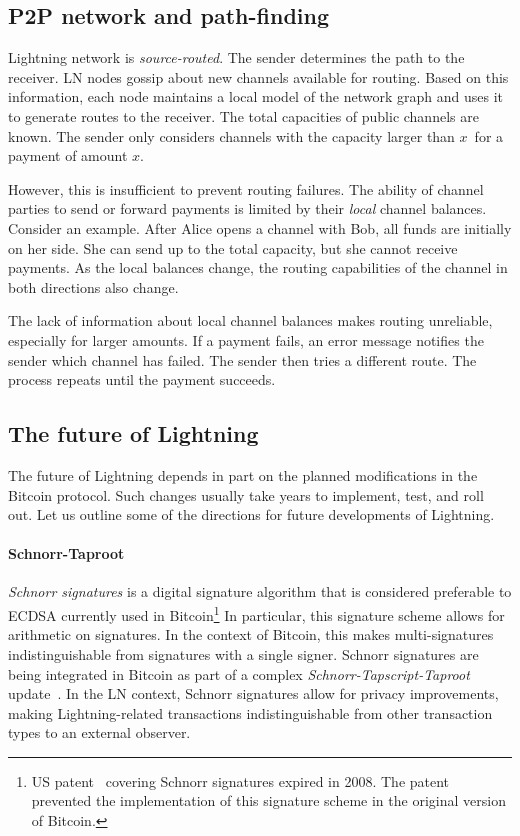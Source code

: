 \subsection{P2P network and path-finding}

Lightning network is \textit{source-routed}.
The sender determines the path to the receiver.
LN nodes gossip about new channels available for routing.
Based on this information, each node maintains a local model of the network graph and uses it to generate routes to the receiver.
The total capacities of public channels are known.
The sender only considers channels with the capacity larger than $x$~for a payment of amount $x$.

However, this is insufficient to prevent routing failures.
The ability of channel parties to send or forward payments is limited by their \textit{local} channel balances.
Consider an example.
After Alice opens a channel with Bob, all funds are initially on her side.
She can send up to the total capacity, but she cannot receive payments.
As the local balances change, the routing capabilities of the channel in both directions also change.

The lack of information about local channel balances makes routing unreliable, especially for larger amounts.
If a payment fails, an error message notifies the sender which channel has failed.
The sender then tries a different route.
The process repeats until the payment succeeds.


\subsection{The future of Lightning}

The future of Lightning depends in part on the planned modifications in the Bitcoin protocol.
Such changes usually take years to implement, test, and roll out.
Let us outline some of the directions for future developments of Lightning.

\paragraph{Schnorr-Taproot}

\textit{Schnorr signatures} is a digital signature algorithm that is considered preferable to ECDSA currently used in Bitcoin\footnote{US patent~\cite{Schnorr1989} covering Schnorr signatures expired in 2008. The patent prevented the implementation of this signature scheme in the original version of Bitcoin.}
In particular, this signature scheme allows for arithmetic on signatures.
In the context of Bitcoin, this makes multi-signatures indistinguishable from signatures with a single signer.
Schnorr signatures are being integrated in Bitcoin as part of a complex \textit{Schnorr-Tapscript-Taproot} update~\cite{Hertig2020}.
In the LN context, Schnorr signatures allow for privacy improvements, making Lightning-related transactions indistinguishable from other transaction types to an external observer.

